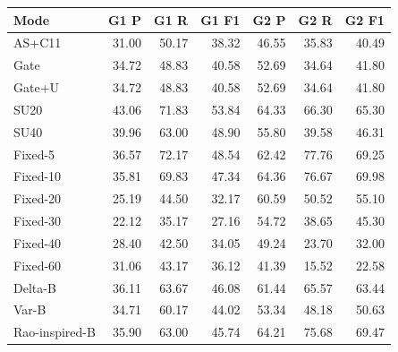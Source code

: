 \begingroup\small\setlength{\tabcolsep}{4pt}\renewcommand{\arraystretch}{1.1}\begin{tabular}{lrrrrrr}\toprule
Mode & G1 P & G1 R & G1 F1 & G2 P & G2 R & G2 F1 \\\midrule
AS+C11 & 31.00 & 50.17 & 38.32 & 46.55 & 35.83 & 40.49 \\
Gate & 34.72 & 48.83 & 40.58 & 52.69 & 34.64 & 41.80 \\
Gate+U & 34.72 & 48.83 & 40.58 & 52.69 & 34.64 & 41.80 \\
SU20 & 43.06 & 71.83 & 53.84 & 64.33 & 66.30 & 65.30 \\
SU40 & 39.96 & 63.00 & 48.90 & 55.80 & 39.58 & 46.31 \\
Fixed-5 & 36.57 & 72.17 & 48.54 & 62.42 & 77.76 & 69.25 \\
Fixed-10 & 35.81 & 69.83 & 47.34 & 64.36 & 76.67 & 69.98 \\
Fixed-20 & 25.19 & 44.50 & 32.17 & 60.59 & 50.52 & 55.10 \\
Fixed-30 & 22.12 & 35.17 & 27.16 & 54.72 & 38.65 & 45.30 \\
Fixed-40 & 28.40 & 42.50 & 34.05 & 49.24 & 23.70 & 32.00 \\
Fixed-60 & 31.06 & 43.17 & 36.12 & 41.39 & 15.52 & 22.58 \\
Delta-B & 36.11 & 63.67 & 46.08 & 61.44 & 65.57 & 63.44 \\
Var-B & 34.71 & 60.17 & 44.02 & 53.34 & 48.18 & 50.63 \\
Rao-inspired-B & 35.90 & 63.00 & 45.74 & 64.21 & 75.68 & 69.47 \\
\bottomrule\end{tabular}\endgroup
